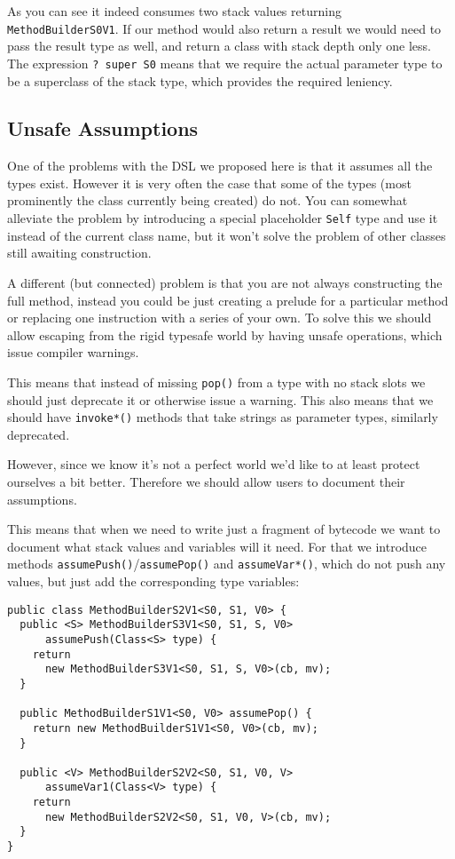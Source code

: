 \documentclass{sig-alternate}
\begin{document}
As you can see it indeed consumes two stack values returning \verb!MethodBuilderS0V1!. If our method would also return a result we would need to pass the result type as well, and return a class with stack depth only one less. The expression \verb!? super S0! means that we require the actual parameter type to be a superclass of the stack type, which provides the required leniency.

\subsection{Unsafe Assumptions}

One of the problems with the DSL we proposed here is that it assumes all the types exist. However it is very often the case that some of the types (most prominently the class currently being created) do not. You can somewhat alleviate the problem by introducing a special placeholder \verb!Self! type and use it instead of the current class name, but it won't solve the problem of other classes still awaiting construction.

A different (but connected) problem is that you are not always constructing the full method, instead you could be just creating a prelude for a particular method or replacing one instruction with a series of your own. To solve this we should allow escaping from the rigid typesafe world by having unsafe operations, which issue compiler warnings.

This means that instead of missing \verb!pop()! from a type with no stack slots we should just deprecate it or otherwise issue a warning. This also means that we should have \verb!invoke*()! methods that take strings as parameter types, similarly deprecated.

However, since we know it's not a perfect world we'd like to at least protect ourselves a bit better. Therefore we should allow users to document their assumptions.

This means that when we need to write just a fragment of bytecode we want to document what stack values and variables will it need. For that we introduce methods \verb!assumePush()!/\verb!assumePop()! and \verb!assumeVar*()!, which do not push any values, but just add the corresponding type variables:

\begin{verbatim}
public class MethodBuilderS2V1<S0, S1, V0> {
  public <S> MethodBuilderS3V1<S0, S1, S, V0> 
      assumePush(Class<S> type) {
    return 
      new MethodBuilderS3V1<S0, S1, S, V0>(cb, mv);
  }

  public MethodBuilderS1V1<S0, V0> assumePop() {
    return new MethodBuilderS1V1<S0, V0>(cb, mv);
  }

  public <V> MethodBuilderS2V2<S0, S1, V0, V> 
      assumeVar1(Class<V> type) {
    return 
      new MethodBuilderS2V2<S0, S1, V0, V>(cb, mv);
  }  
}	
\end{verbatim}
\end{document}
